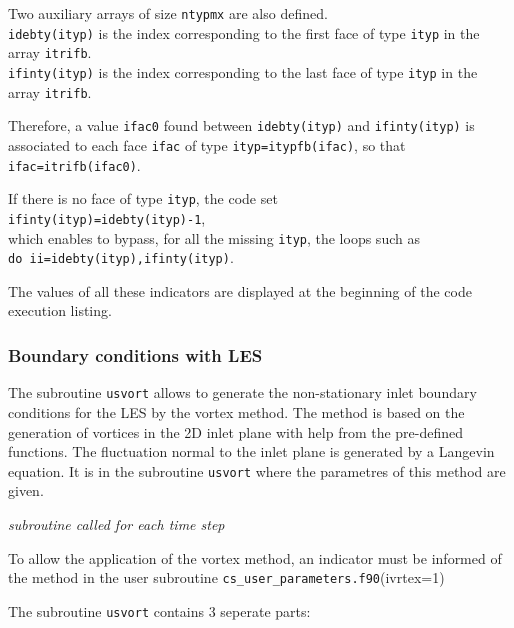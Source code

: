 {{{Two auxiliary arrays of size \texttt{ntypmx} are also defined.\\
\texttt{idebty(ityp)} is the index
corresponding to the first
face of type \texttt{ityp} in the array \texttt{itrifb}.\\
\texttt{ifinty(ityp)} is the index
corresponding to the last
face of type \texttt{ityp} in the array \texttt{itrifb}.

Therefore, a value \texttt{ifac0} found between \texttt{idebty(ityp)} and
\texttt{ifinty(ityp)} is associated to each face \texttt{ifac} of type
\texttt{ityp=itypfb(ifac)}, so that \texttt{ifac=itrifb(ifac0)}.

If there is no face of type \texttt{ityp}, the code set \\
\texttt{ifinty(ityp)=idebty(ityp)-1},\\
which enables to bypass, for all the missing \texttt{ityp}, the loops such as \\
\texttt{do ii=idebty(ityp),ifinty(ityp)}.

The values of all these indicators are displayed at the beginning of the
code execution listing.

\subsubsection[Boundary conditions with LES]
{Boundary conditions with LES}
\label{prg_usvort}%
The subroutine \texttt{usvort} allows to generate the non-stationary inlet boundary
conditions for the LES by the vortex method. The method is based on
 the generation of vortices in the 2D inlet plane with help from
the pre-defined functions. The fluctuation normal to the inlet plane
is generated by a Langevin equation. It is in the subroutine \texttt{usvort}
 where the parametres of this method are given.

\noindent
\textit{subroutine called for each time step}

To allow the application of the vortex method, an indicator must be informed of
the method in the user subroutine \texttt{cs\_user\_parameters.f90}(ivrtex=1)

The subroutine \texttt{usvort} contains 3 seperate parts:

}}}
